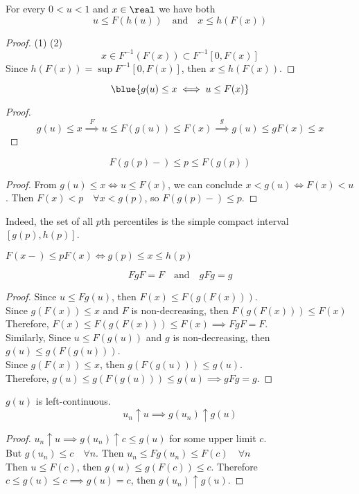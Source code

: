 \documentclass[11pt]{article}
\numberwithin{equation}{section}
\begin{document}
\proposition For every $0<u<1$ and $x \in \real$ we have both
\begin{equation}
	u \leq F(h(u)) \quad \text{and} \quad x \leq h(F(x))
\end{equation}
\begin{proof}
	(1) 
	(2) $$x \in F^{-1}(F(x)) \subset F^{-1}[0, F(x)]$$
	Since $h(F(x)) = \sup F^{-1}[0, F(x)]$, then $x \leq h(F(x))$.
\end{proof}

\corollary \label{quantile iff} \begin{equation}\blue{g(u) \leq x \iff u \leq F(x)}\end{equation}
\begin{proof}
	$$g(u) \leq x \overset{F}{\implies} u \leq F(g(u)) \leq F(x) \overset{g}{\implies} g(u) \leq g F(x) \leq x$$
\end{proof}

\corollary 
\begin{equation}
	F(g(p)-) \leq p \leq F(g(p))
\end{equation}
\begin{proof}
	From $g(u) \leq x \iff u \leq F(x)$, we can conclude $x < g(u) \iff F(x) < u$.
	Then $F(x) < p \quad \forall x < g(p)$, so $F(g(p)-) \leq p$.
\end{proof}

\remark
Indeed, the set of all $p$th percentiles is the simple compact interval $[g(p), h(p)]$.

\corollary $F(x-) \leq p F(x) \iff g(p) \leq x \leq h(p)$

\corollary $$FgF = F\quad \text{and} \quad gFg = g$$
\begin{proof}
	Since $u \leq Fg(u)$, then $F(x) \leq F(g(F(x)))$. \\
	Since $g(F(x)) \leq x$ and $F$ is non-decreasing, then $F(g(F(x))) \leq F(x)$ \\
	Therefore, $F(x) \leq F(g(F(x))) \leq F(x) \implies FgF = F$.\\
	Similarly, Since $u \leq F(g(u))$ and $g$ is non-decreasing, then $g(u) \leq g(F(g(u)))$.\\
	Since $g(F(x)) \leq x$, then $g(F(g(u))) \leq g(u)$.\\
	Therefore, $g(u) \leq g(F(g(u))) \leq g(u) \implies gFg = g$.
\end{proof}

\corollary $g(u)$ is left-continuous.
\begin{equation}
	u_n \uparrow u \implies g(u_n) \uparrow g(u)
\end{equation}
\begin{proof}
	$u_n \uparrow u \implies g(u_n) \uparrow c \leq g(u)$ for some upper limit $c$. \\
	But $g(u_n) \leq c \quad \forall n$. Then $u_n \leq Fg(u_n) \leq F(c) \quad \forall n$ \\
	Then $u \leq F(c)$, then $g(u) \leq g(F(c)) \leq c$.
	Therefore $c \leq g(u) \leq c \implies g(u) = c$, then $g(u_n) \uparrow g(u)$.
\end{proof}
\end{document}
